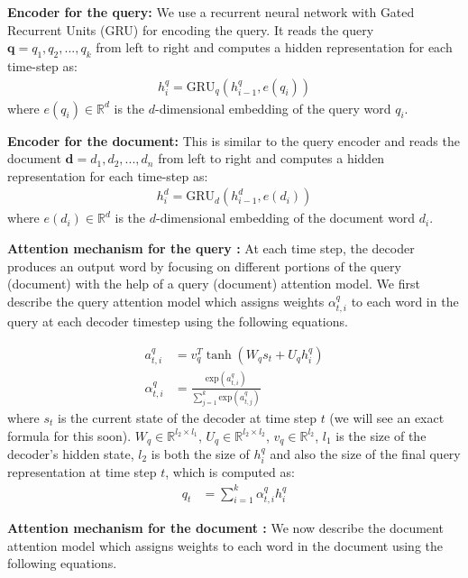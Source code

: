 \documentclass[11pt]{article}
\begin{document}
\noindent \textbf{Encoder for the query:} We use a recurrent neural network with Gated Recurrent Units (GRU) for encoding the query. It reads the query $\mathbf{q} = q_1, q_2, ..., q_k$ from left to right and computes a hidden representation for each time-step as:
\begin{align}
h_i^q = \text{GRU}_q(h_{i-1}^q, e(q_i))
\end{align}
where $e(q_i) \in \mathbb{R}^d$ is the $d$-dimensional embedding of the query word $q_i$. 

\noindent \textbf{Encoder for the document:} This is similar to the query encoder and reads the document $\mathbf{d} = d_1, d_2, ..., d_n$ from left to right and computes a hidden representation for each time-step as: 
\begin{align}
h_i^d = \text{GRU}_d(h_{i-1}^d, e(d_i))
\end{align}
where $e(d_i) \in \mathbb{R}^d$ is the $d$-dimensional embedding of the document word $d_i$.

\noindent \textbf{Attention mechanism for the query :} At each time step, the decoder produces an output word by focusing on different portions of the query (document) with the help of a query (document) attention model. We first describe the query attention model which assigns weights $\alpha_{t,i}^q$ to each word in the query at each decoder timestep using the following equations.

\begin{align}
a_{t,i}^q &= v_q^T \tanh(W_qs_t + U_qh^q_i) \\
\alpha_{t,i}^q &= \frac{\text{exp}(a_{t,i}^q)}{\sum_{j=1}^{k} \text{exp}(a_{t,j}^q)}
\end{align}
where $s_t$ is the current state of the decoder at time step $t$ (we will see an exact formula for this soon). $W_q \in \mathbb{R}^{l_{2} \times l_{1}}$, $U_q \in \mathbb{R}^{l_{2} \times l_{2}}$, $v_q \in \mathbb{R}^{l_{2}}$, $l_{1}$ is the size of the decoder's hidden state, $l_{2}$ is both the size of $h_i^q$ and also the size of the final query representation at time step $t$, which is computed as:
\begin{align}
q_t &= \sum_{i=1}^{k} \alpha_{t,i}^q h_{i}^{q}
\end{align}

\noindent \textbf{Attention mechanism for the document :} We now describe the document attention model which assigns weights to each word in the document using the following equations.
\end{document}
